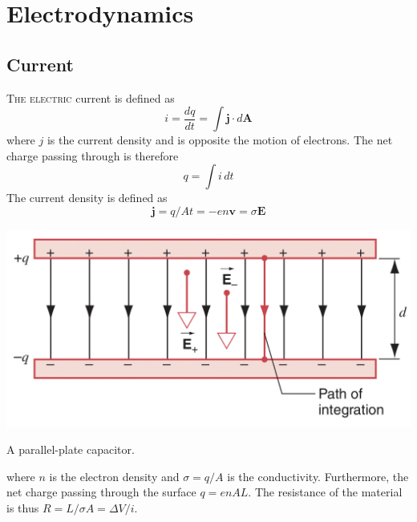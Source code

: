 \documentclass{tufte-book}
\renewcommand{\b}{\mathbf}
\begin{document}
\chapter{Electrodynamics}

\section{Current}

\textsc{The electric} current is defined as
\begin{equation}
  i = \frac{dq}{dt} = \int \b j \cdot d \b A
\end{equation} where $j$ is the current density and is opposite the motion of electrons. The net charge passing through is therefore
\begin{equation}
  q = \int i \, dt
\end{equation}
The current density is defined as
\begin{equation}
  \b j = q/At = - en \b v = \sigma \b E
\end{equation}
\begin{marginfigure}
  \includegraphics[width=1\textwidth]{ppc}
  \caption{A parallel-plate capacitor.}
\end{marginfigure}
where $n$ is the electron density and $\sigma = q/A$ is the conductivity. Furthermore, the net charge passing through the surface $q = enAL$. The resistance of the material is thus $R = L/\sigma A = \Delta V / i$.
\end{document}
